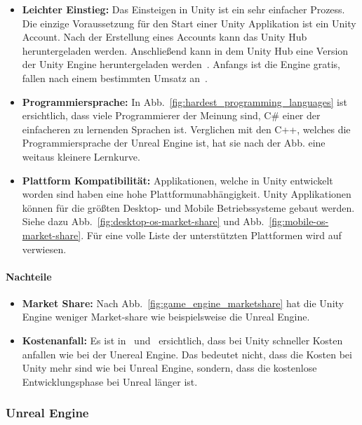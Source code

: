 \begin{itemize}
    \item \textbf{Leichter Einstieg:} Das Einsteigen in Unity ist ein sehr einfacher Prozess.
    Die einzige Voraussetzung für den Start einer Unity Applikation ist ein Unity Account.
    Nach der Erstellung eines Accounts kann das Unity Hub heruntergeladen werden.
    Anschließend kann in dem Unity Hub eine Version der Unity Engine heruntergeladen werden~\cite{Unity_Download}.
    Anfangs ist die Engine gratis, fallen nach einem bestimmten Umsatz an~\cite{Unity_Pricing_2}.
    \item \textbf{Programmiersprache:} In Abb.~\ref{fig:hardest_programming_languages} ist ersichtlich, dass viele Programmierer der Meinung sind, C\# einer der einfacheren zu lernenden Sprachen ist.
    Verglichen mit den C++, welches die Programmiersprache der Unreal Engine ist, hat sie nach der Abb. eine weitaus kleinere Lernkurve.
    \item \textbf{Plattform Kompatibilität:} Applikationen, welche in Unity entwickelt worden sind haben eine hohe Plattformunabhängigkeit.
    Unity Applikationen können für die größten Desktop- und Mobile Betriebssysteme gebaut werden.
    Siehe dazu Abb.~\ref{fig:desktop-os-market-share} und Abb.~\ref{fig:mobile-os-market-share}.
    Für eine volle Liste der unterstützten Plattformen wird auf~\cite{UNITY_PLATTFORMS} verwiesen.
\end{itemize}

\paragraph{Nachteile}

\begin{itemize}
    \item \textbf{Market Share:} Nach Abb.~\ref{fig:game_engine_marketshare} hat die Unity Engine weniger Market-share wie beispielsweise die Unreal Engine.
    \item \textbf{Kostenanfall:} Es ist in~\cite{UNREAL_ENGINE_PRICING_2022} und~\cite{Unity_Pricing_2} ersichtlich, dass bei Unity schneller Kosten anfallen wie bei der Unereal Engine.
    Das bedeutet nicht, dass die Kosten bei Unity mehr sind wie bei Unreal Engine, sondern, dass die kostenlose Entwicklungsphase bei Unreal länger ist.
\end{itemize}

\subsubsection{Unreal Engine}
\label{sec:unreal_engine}


